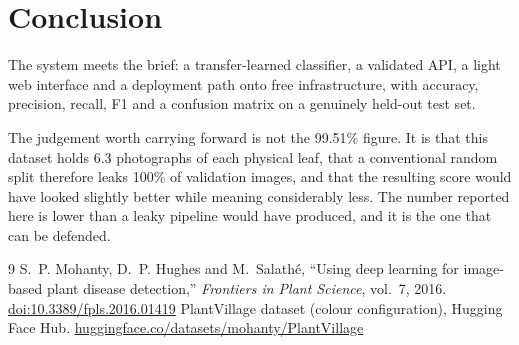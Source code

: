 \documentclass[10pt,a4paper]{article}
\begin{document}
\section{Conclusion}

The system meets the brief: a transfer-learned classifier, a validated API, a light web
interface and a deployment path onto free infrastructure, with accuracy, precision,
recall, F1 and a confusion matrix on a genuinely held-out test set.

The judgement worth carrying forward is not the 99.51\% figure. It is that this dataset
holds 6.3 photographs of each physical leaf, that a conventional random split therefore
leaks 100\% of validation images, and that the resulting score would have looked
slightly better while meaning considerably less. The number reported here is lower than
a leaky pipeline would have produced, and it is the one that can be defended.

\begin{thebibliography}{9}\small
{}
S.~P. Mohanty, D.~P. Hughes and M.~Salath\'e,
``Using deep learning for image-based plant disease detection,''
\emph{Frontiers in Plant Science}, vol.~7, 2016.
\href{https://doi.org/10.3389/fpls.2016.01419}{doi:10.3389/fpls.2016.01419}
PlantVillage dataset (colour configuration), Hugging Face Hub.
\href{https://huggingface.co/datasets/mohanty/PlantVillage}{huggingface.co/datasets/mohanty/PlantVillage}
\end{thebibliography}
\end{document}
